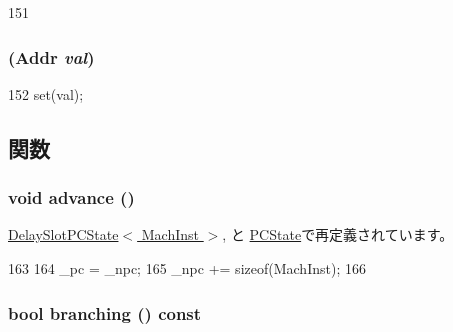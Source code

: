 \begin{DoxyCode}
151 {}
\end{DoxyCode}
\hypertarget{classGenericISA_1_1SimplePCState_aef426796c6d2f489ce04fc7ca7caf147}{
\subsubsection[{SimplePCState}]{ ({\bf Addr} {\em val})}}
\label{classGenericISA_1_1SimplePCState_aef426796c6d2f489ce04fc7ca7caf147}



\begin{DoxyCode}
152 { set(val); }
\end{DoxyCode}


\subsection{関数}
\hypertarget{classGenericISA_1_1SimplePCState_a8903a4e9f3d5fb42d0faa9d53e21d85c}{
\subsubsection[{advance}]{\setlength{\rightskip}{0pt plus 5cm}void advance ()}}
\label{classGenericISA_1_1SimplePCState_a8903a4e9f3d5fb42d0faa9d53e21d85c}


\hyperlink{classGenericISA_1_1DelaySlotPCState_a8903a4e9f3d5fb42d0faa9d53e21d85c}{DelaySlotPCState$<$ MachInst $>$}, と \hyperlink{classX86ISA_1_1PCState_a8903a4e9f3d5fb42d0faa9d53e21d85c}{PCState}で再定義されています。


\begin{DoxyCode}
163     {
164         _pc = _npc;
165         _npc += sizeof(MachInst);
166     }
\end{DoxyCode}
\hypertarget{classGenericISA_1_1SimplePCState_ae3f0eb15a9382eefff6b00cf7999c2e3}{
\subsubsection[{branching}]{\setlength{\rightskip}{0pt plus 5cm}bool branching () const}}
\label{classGenericISA_1_1SimplePCState_ae3f0eb15a9382eefff6b00cf7999c2e3}


